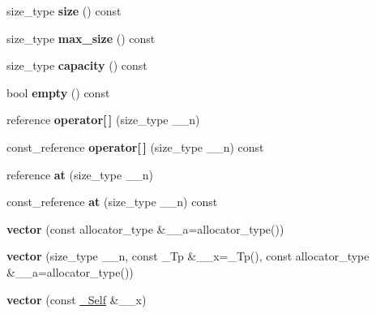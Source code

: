 \begin{DoxyCompactItemize}
\item 
\mbox{\label{structvector_a9e99025ce65ac17571d8707bcb5af9c8}} 
size\+\_\+type {\bfseries size} () const
\item 
\mbox{\label{structvector_a43dfb7e0a66435621fa9018cffb79ac1}} 
size\+\_\+type {\bfseries max\+\_\+size} () const
\item 
\mbox{\label{structvector_a53e2ba58c4c130fd560f526637a2154b}} 
size\+\_\+type {\bfseries capacity} () const
\item 
\mbox{\label{structvector_ab9a783d8d91734251c0b46c6adf20180}} 
bool {\bfseries empty} () const
\item 
\mbox{\label{structvector_a62f3e2125fac1d84617c6b33c128843a}} 
reference {\bfseries operator\mbox{[}$\,$\mbox{]}} (size\+\_\+type \+\_\+\+\_\+n)
\item 
\mbox{\label{structvector_acac936491ad02cb1e4c218399f380545}} 
const\+\_\+reference {\bfseries operator\mbox{[}$\,$\mbox{]}} (size\+\_\+type \+\_\+\+\_\+n) const
\item 
\mbox{\label{structvector_aa87917d77fcc1920cc26b8335e52db4b}} 
reference {\bfseries at} (size\+\_\+type \+\_\+\+\_\+n)
\item 
\mbox{\label{structvector_adee4d05f69a240fba15456cde96efa7e}} 
const\+\_\+reference {\bfseries at} (size\+\_\+type \+\_\+\+\_\+n) const
\item 
\mbox{\label{structvector_a742ee2395e0ccfd466fc7facb0cbff0e}} 
{\bfseries vector} (const allocator\+\_\+type \&\+\_\+\+\_\+a=allocator\+\_\+type())
\item 
\mbox{\label{structvector_abd45293e22a695b8b70c06b0ea21ac1e}} 
{\bfseries vector} (size\+\_\+type \+\_\+\+\_\+n, const \+\_\+\+Tp \&\+\_\+\+\_\+x=\+\_\+\+Tp(), const allocator\+\_\+type \&\+\_\+\+\_\+a=allocator\+\_\+type())
\item 
\mbox{\label{structvector_a3059188b3b0449014b97b57ffca94e37}} 
{\bfseries vector} (const \hyperlink{structvector}{\+\_\+\+Self} \&\+\_\+\+\_\+x)

\end{DoxyCompactItemize}
